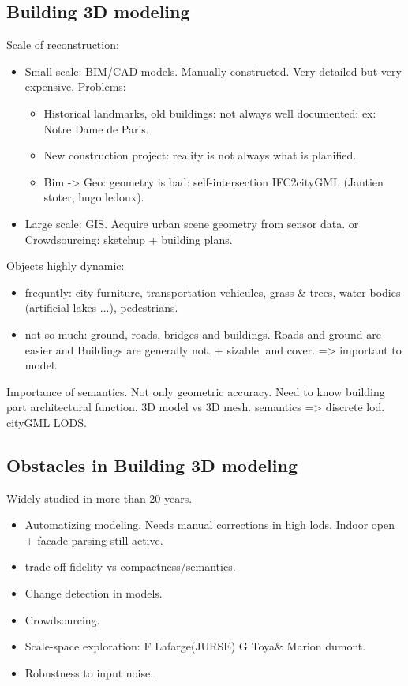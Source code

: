     \subsection{Building 3D modeling}
        \label{subsec::introduction::urban_3d_reconstruction::building_3d_modeling}
        Scale of reconstruction:
        \begin{itemize}
            \item Small scale: BIM/CAD models. Manually constructed. Very detailed but very expensive. Problems:
            \begin{itemize}
                \item Historical landmarks, old buildings: not always well documented: ex: Notre Dame de Paris.
                \item New construction project: reality is not always what is planified.
                \item Bim -> Geo: geometry is bad: self-intersection IFC2cityGML (Jantien stoter, hugo ledoux).
            \end{itemize}
            \item Large scale: GIS. Acquire urban scene geometry from sensor data. or Crowdsourcing: sketchup + building plans.
        \end{itemize}
        Objects highly dynamic:
        \begin{itemize}
            \item frequntly: city furniture, transportation vehicules, grass \& trees, water bodies (artificial lakes ...), pedestrians.
            \item not so much: ground, roads, bridges and buildings. Roads and ground are easier and Buildings are generally not. + sizable land cover. => important to model.\\
        \end{itemize}
        Importance of semantics. Not only geometric accuracy. Need to know building part architectural function. 3D model vs 3D mesh.
        semantics => discrete lod. cityGML LODS.\\
    \subsection{Obstacles in Building 3D modeling}
        \label{subsec::introduction::urban_3d_reconstruction::challenges}
        Widely studied in more than 20 years.\\
        \begin{itemize}
            \item Automatizing modeling. Needs manual corrections in high lods. Indoor open + facade parsing still active.
            \item trade-off fidelity vs compactness/semantics.
            \item Change detection in models.
            \item Crowdsourcing.
            \item Scale-space exploration: F Lafarge(JURSE) G Toya\& Marion dumont.
            \item Robustness to input noise.
        \end{itemize}
